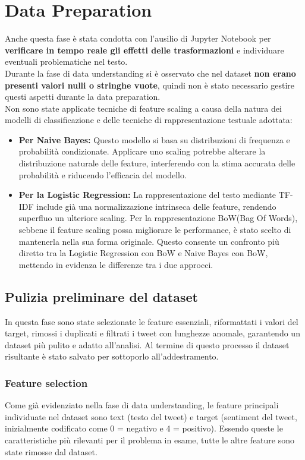 \documentclass[12pt,a4paper]{report} %
\begin{document}
\chapter{Data Preparation}
Anche questa fase è stata condotta con l'ausilio di Jupyter Notebook per \textbf{verificare in tempo reale gli effetti delle trasformazioni} e individuare eventuali problematiche nel testo.\\Durante la fase di data understanding si è osservato che nel dataset \textbf{non erano presenti valori nulli o stringhe vuote}, quindi non è stato necessario gestire questi aspetti durante la data preparation. \\Non sono state applicate tecniche di feature scaling a causa della natura dei modelli di classificazione e delle tecniche di rappresentazione testuale adottata:
\begin{itemize}
    \item \textbf{Per Naive Bayes:} Questo modello si basa su distribuzioni di frequenza e probabilità condizionate. Applicare uno scaling potrebbe alterare la distribuzione naturale delle feature, interferendo con la stima accurata delle probabilità e riducendo l’efficacia del modello.
    \item \textbf{Per la Logistic Regression:} La rappresentazione del testo mediante TF-IDF include già una normalizzazione intrinseca delle feature, rendendo superfluo un ulteriore scaling. Per la rappresentazione BoW(Bag Of Words), sebbene il feature scaling possa migliorare le performance, è stato scelto di mantenerla nella sua forma originale. Questo consente un confronto più diretto tra la Logistic Regression con BoW e Naive Bayes con BoW, mettendo in evidenza le differenze tra i due approcci. 
\end{itemize}
 \section{Pulizia preliminare del dataset}
 In questa fase sono state selezionate le feature essenziali, riformattati i valori del target, rimossi i duplicati e filtrati i tweet con lunghezze anomale, garantendo un dataset più pulito e adatto all’analisi. Al termine di questo processo il dataset risultante è stato salvato per sottoporlo all'addestramento.
\subsection{ Feature selection}
Come già evidenziato nella fase di data understanding, le feature principali individuate nel dataset sono text (testo del tweet) e target (sentiment del tweet, inizialmente codificato come 0 = negativo e 4 = positivo). Essendo queste le caratteristiche più rilevanti per il problema in esame, tutte le altre feature sono state rimosse dal dataset.
\end{document}

